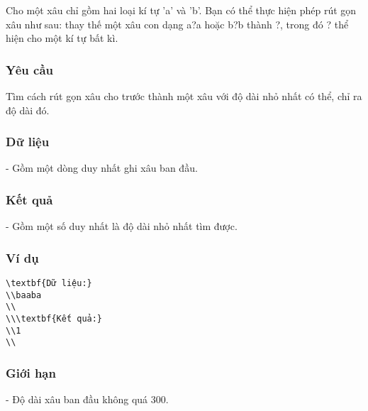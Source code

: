 







   Cho một xâu chỉ gồm hai loại kí tự 'a' và 'b'. Bạn có thể thực hiện phép rút gọn xâu như sau: thay thế một xâu con dạng a?a hoặc b?b thành ?, trong đó ? thể hiện cho một kí tự bất kì.  

\subsubsection{   Yêu cầu  }

   Tìm cách rút gọn xâu cho trước thành một xâu với độ dài nhỏ nhất có thể, chỉ ra độ dài đó.  

\subsubsection{   Dữ liệu  }

   - Gồm một dòng duy nhất ghi xâu ban đầu.  

\subsubsection{   Kết quả  }

   - Gồm một số duy nhất là độ dài nhỏ nhất tìm được.  

\subsubsection{   Ví dụ  }
\begin{verbatim}
\textbf{Dữ liệu:}
\\baaba
\\
\\\textbf{Kết quả:}
\\1
\\\end{verbatim}

\subsubsection{   Giới hạn  }

   - Độ dài xâu ban đầu không quá 300.  

